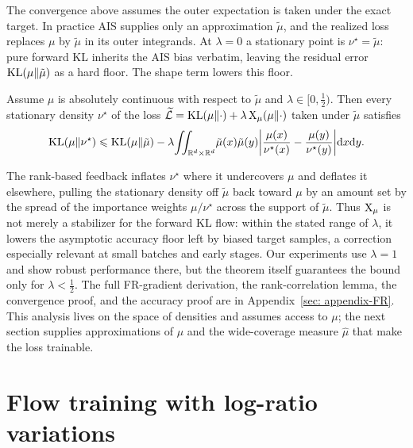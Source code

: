 \documentclass{article}
\begin{document}
The convergence above assumes the outer expectation is taken under the exact target. In practice AIS supplies only an approximation $\tilde\mu$, and the realized loss replaces $\mu$ by $\tilde\mu$ in its outer integrands. At $\lambda = 0$ a stationary point is $\nu^\star = \tilde\mu$: pure forward KL inherits the AIS bias verbatim, leaving the residual error $\mathrm{KL}(\mu\|\tilde\mu)$ as a hard floor. The shape term lowers this floor.
\begin{theorem}
\label{thm: accuracy}
Assume $\mu$ is absolutely continuous with respect to $\tilde\mu$ and $\lambda \in [0, \tfrac12)$. Then every stationary density $\nu^\star$ of the loss $\widetilde{\mathcal L} = \mathrm{KL}(\mu\|\cdot) + \lambda\,\mathrm{X}_\mu(\mu\|\cdot)$ taken under $\tilde\mu$ satisfies
\begin{equation}
    \mathrm{KL}(\mu\|\nu^\star) \leqslant \mathrm{KL}(\mu\|\tilde\mu) - \lambda\!\iint_{\mathbb R^d\times\mathbb R^d}\!\tilde\mu(x)\tilde\mu(y) \biggl|\frac{\mu(x)}{\nu^\star(x)} - \frac{\mu(y)}{\nu^\star(y)}\biggr| \mathrm{d} x \mathrm{d} y.
    \label{eq: accuracy-bound}
\end{equation}
\end{theorem}
\noindent The rank-based feedback inflates $\nu^\star$ where it undercovers $\mu$ and deflates it elsewhere, pulling the stationary density off $\tilde\mu$ back toward $\mu$ by an amount set by the spread of the importance weights $\mu/\nu^\star$ across the support of $\tilde\mu$. Thus $\mathrm{X}_\mu$ is not merely a stabilizer for the forward KL flow: within the stated range of $\lambda$, it lowers the asymptotic accuracy floor left by biased target samples, a correction especially relevant at small batches and early stages. Our experiments use $\lambda=1$ and show robust performance there, but the theorem itself guarantees the bound only for $\lambda<\tfrac12$. The full FR-gradient derivation, the rank-correlation lemma, the convergence proof, and the accuracy proof are in Appendix~\ref{sec: appendix-FR}. This analysis lives on the space of densities and assumes access to $\mu$; the next section supplies approximations of $\mu$ and the wide-coverage measure $\hat\mu$ that make the loss trainable.

\section{Flow training with log-ratio variations}
\label{sec: training}
\end{document}
